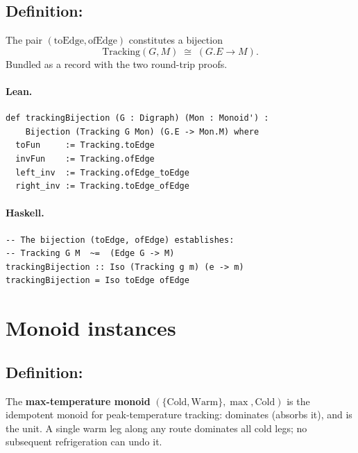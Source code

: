 \documentclass[11pt,a4paper]{article}
\begin{document}
\subsection{Definition: }

\begin{defn}
The pair $(\mathrm{toEdge}, \mathrm{ofEdge})$ constitutes a bijection
\[
  \mathrm{Tracking}(G, M) \;\cong\; (G.E \to M).
\]
Bundled as a  record with the two round-trip proofs.
\end{defn}

\paragraph{Lean.}
\begin{lstlisting}[style=lean]
def trackingBijection (G : Digraph) (Mon : Monoid') :
    Bijection (Tracking G Mon) (G.E -> Mon.M) where
  toFun     := Tracking.toEdge
  invFun    := Tracking.ofEdge
  left_inv  := Tracking.ofEdge_toEdge
  right_inv := Tracking.toEdge_ofEdge
\end{lstlisting}

\paragraph{Haskell.}
\begin{lstlisting}[style=haskell]
-- The bijection (toEdge, ofEdge) establishes:
-- Tracking G M  ~=  (Edge G -> M)
trackingBijection :: Iso (Tracking g m) (e -> m)
trackingBijection = Iso toEdge ofEdge
\end{lstlisting}


\section{Monoid instances}

\subsection{Definition: }

\begin{defn}
The \textbf{max-temperature monoid} $(\{\mathrm{Cold}, \mathrm{Warm}\},
\max, \mathrm{Cold})$ is the idempotent monoid for peak-temperature tracking:
 dominates  (absorbs it), and  is the unit.
A single warm leg along any route dominates all cold legs; no subsequent
refrigeration can undo it.
\end{defn}
\end{document}
